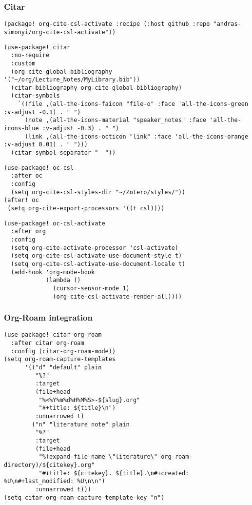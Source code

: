\documentclass[c]{article}
\theoremstyle{plain}%
\theoremstyle{definition}
\theoremstyle{remark}
\begin{document}
\subsubsection{Citar}
\label{sec:orgde615e9}
\begin{verbatim}
(package! org-cite-csl-activate :recipe (:host github :repo "andras-simonyi/org-cite-csl-activate"))
\end{verbatim}
\begin{verbatim}
(use-package! citar
  :no-require
  :custom
  (org-cite-global-bibliography '("~/org/Lecture_Notes/MyLibrary.bib"))
  (citar-bibliography org-cite-global-bibliography)
  (citar-symbols
    `((file ,(all-the-icons-faicon "file-o" :face 'all-the-icons-green :v-adjust -0.1) . " ")
      (note ,(all-the-icons-material "speaker_notes" :face 'all-the-icons-blue :v-adjust -0.3) . " ")
      (link ,(all-the-icons-octicon "link" :face 'all-the-icons-orange :v-adjust 0.01) . " ")))
  (citar-symbol-separator "  "))

\end{verbatim}
\begin{verbatim}
(use-package! oc-csl
  :after oc
  :config
  (setq org-cite-csl-styles-dir "~/Zotero/styles/"))
(after! oc
 (setq org-cite-export-processors '((t csl))))

\end{verbatim}
\begin{verbatim}
(use-package! oc-csl-activate
  :after org
  :config
  (setq org-cite-activate-processor 'csl-activate)
  (setq org-cite-csl-activate-use-document-style t)
  (setq org-cite-csl-activate-use-document-locale t)
  (add-hook 'org-mode-hook
            (lambda ()
              (cursor-sensor-mode 1)
              (org-cite-csl-activate-render-all))))

\end{verbatim}
\subsubsection{Org-Roam integration}
\label{sec:org2482fb2}
\begin{verbatim}
(use-package! citar-org-roam
  :after citar org-roam
  :config (citar-org-roam-mode))
(setq org-roam-capture-templates
      '(("d" "default" plain
         "%?"
         :target
         (file+head
          "%<%Y%m%d%H%M%S>-${slug}.org"
          "#+title: ${title}\n")
         :unnarrowed t)
        ("n" "literature note" plain
         "%?"
         :target
         (file+head
          "%(expand-file-name \"literature\" org-roam-directory)/${citekey}.org"
          "#+title: ${citekey}. ${title}.\n#+created: %U\n#+last_modified: %U\n\n")
         :unnarrowed t)))
(setq citar-org-roam-capture-template-key "n")
\end{verbatim}
\end{document}

